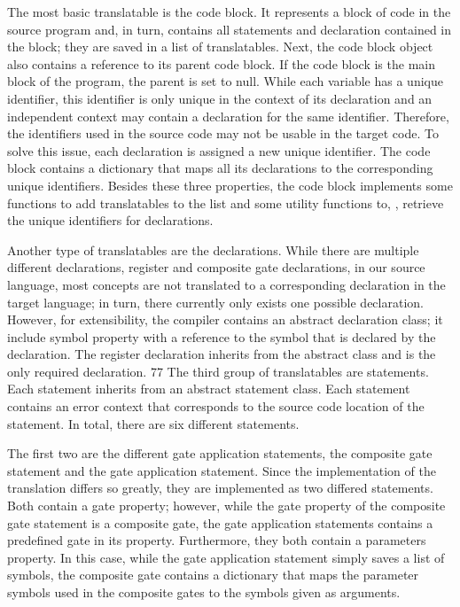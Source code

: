The most basic translatable is the code block. It represents a block of code in the source program and, in turn, contains all statements and declaration contained in the block; they are saved in a list of translatables. Next, the code block object also contains a reference to its parent code block. If the code block is the main block of the program, the parent is set to null. While each variable has a unique identifier, this identifier is only unique in the context of its declaration and an independent context may contain a declaration for the same identifier. Therefore, the identifiers used in the source code may not be usable in the target code. To solve this issue, each declaration is assigned a new unique identifier. The code block contains a dictionary that maps all its declarations to the corresponding unique identifiers. Besides these three properties, the code block implements some functions to add translatables to the list and some utility functions to, \eg, retrieve the unique identifiers for declarations.

Another type of translatables are the declarations. While there are multiple different declarations, \eg register and composite gate declarations, in our source language, most concepts are not translated to a corresponding declaration in the target language; in turn, there currently only exists one possible declaration. However, for extensibility, the compiler contains an abstract declaration class; it include symbol property with a reference to the symbol that is declared by the declaration. The register declaration inherits from the abstract class and is the only required declaration. 
77
The third group of translatables are statements. Each statement inherits from an abstract statement class. Each statement contains an error context that corresponds to the source code location of the statement. In total, there are six different statements. 

The first two are the different gate application statements, the composite gate statement and the gate application statement. Since the implementation of the translation differs so greatly, they are implemented as two differed statements. Both contain a gate property; however, while the gate property of the composite gate statement is a composite gate, the gate application statements contains a predefined gate in its property. Furthermore, they both contain a parameters property. In this case, while the gate application statement simply saves a list of symbols, the composite gate contains a dictionary that maps the parameter symbols used in the composite gates to the symbols given as arguments.

